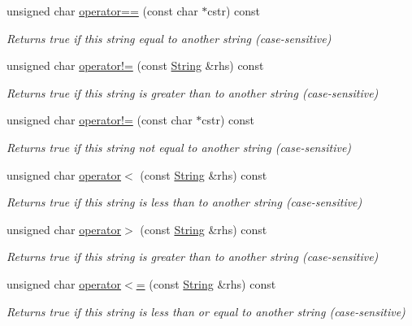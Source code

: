 \begin{DoxyCompactItemize}
unsigned char \hyperlink{class_string_ad453b9631caf5d0164ae493bf1aa9680}{operator==} (const char $\ast$cstr) const
\begin{DoxyCompactList}\small\item\em Returns true if this string equal to another string (case-\/sensitive) \end{DoxyCompactList}\item 
unsigned char \hyperlink{class_string_a4eda494a17ada57b9e8975c5b44b5227}{operator!=} (const \hyperlink{class_string}{String} \&rhs) const
\begin{DoxyCompactList}\small\item\em Returns true if this string is greater than to another string (case-\/sensitive) \end{DoxyCompactList}\item 
unsigned char \hyperlink{class_string_aa3bec091af9c137939b348138ae06e93}{operator!=} (const char $\ast$cstr) const
\begin{DoxyCompactList}\small\item\em Returns true if this string not equal to another string (case-\/sensitive) \end{DoxyCompactList}\item 
unsigned char \hyperlink{class_string_ae536c93957c3e2369a94bbdf99037681}{operator$<$} (const \hyperlink{class_string}{String} \&rhs) const
\begin{DoxyCompactList}\small\item\em Returns true if this string is less than to another string (case-\/sensitive) \end{DoxyCompactList}\item 
unsigned char \hyperlink{class_string_a25bbbdda663b6b0eb3ed3458e80fc66e}{operator$>$} (const \hyperlink{class_string}{String} \&rhs) const
\begin{DoxyCompactList}\small\item\em Returns true if this string is greater than to another string (case-\/sensitive) \end{DoxyCompactList}\item 
unsigned char \hyperlink{class_string_a111fa1bc3ab1c20223cc8940cd122278}{operator$<$=} (const \hyperlink{class_string}{String} \&rhs) const
\begin{DoxyCompactList}\small\item\em Returns true if this string is less than or equal to another string (case-\/sensitive) \end{DoxyCompactList}\item 

\end{DoxyCompactItemize}
